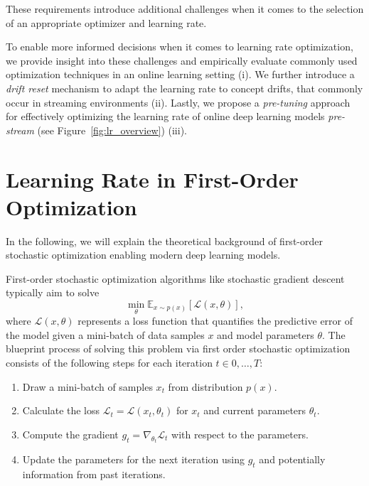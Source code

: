 \documentclass[runningheads]{llncs}
\begin{document}
These requirements introduce additional challenges when it comes to the selection of an appropriate optimizer and learning rate.

To enable more informed decisions when it comes to learning rate optimization, we provide insight into these challenges and empirically evaluate commonly used optimization techniques in an online learning setting (i).
We further introduce a \textit{drift reset} mechanism to adapt the learning rate to concept drifts, that commonly occur in streaming environments (ii).
Lastly, we propose a \textit{pre-tuning} approach for effectively optimizing the learning rate of online deep learning models \textit{pre-stream} (see Figure~\ref{fig:lr_overview}) (iii).


\section{Learning Rate in First-Order Optimization}

In the following, we will explain the theoretical background of first-order stochastic optimization enabling modern deep learning models.

First-order stochastic optimization algorithms like stochastic gradient descent typically aim to solve
\begin{equation}
	\min_{\theta} \mathbb{E}_{x \sim p(x)} [\mathcal{L}(x, \theta)],
\end{equation}
where $\mathcal{L}(x, \theta)$ represents a loss function that quantifies the predictive error of the model given a mini-batch of data samples $x$ and model parameters $\theta$.
The blueprint process of solving this problem via first order stochastic optimization consists of the following steps for each iteration $t \in 0, \ldots, T$:
\begin{enumerate}
	\item Draw a mini-batch of samples $x_t$ from distribution $p(x)$.
	\item Calculate the loss $\mathcal{L}_t = \mathcal{L}(x_t, \theta_t)$ for $x_t$ and current parameters $\theta_t$.
	\item Compute the gradient $g_t = \nabla_{\theta_t} \mathcal{L}_t$ with respect to the parameters.
	\item Update the parameters for the next iteration using $g_t$ and potentially information from past iterations.
\end{enumerate}
\end{document}
